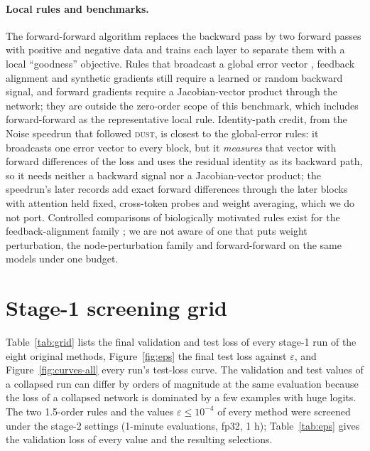 \documentclass{article}
\newcommand{\method}[1]{\textsc{#1}}
\newcommand{\DUST}{\method{dust}}
\begin{document}
\paragraph{Local rules and benchmarks.}
The forward-forward algorithm \citep{hinton2022} replaces the backward pass by two
forward passes with positive and negative data and trains each layer to separate them
with a local ``goodness'' objective. Rules that broadcast a global error vector
\citep{clark2021credit}, feedback alignment \citep{lillicrap2016,nokland2016} and
synthetic gradients \citep{jaderberg2017} still require a learned or random backward
signal, and forward gradients \citep{baydin2022,ren2023} require a Jacobian-vector
product through the network; they are outside the zero-order scope of this benchmark,
which includes forward-forward as the representative local rule. Identity-path credit,
from the Noise speedrun \citep{noise2026} that followed \DUST{}, is closest to the
global-error rules: it broadcasts one error vector to every block, but it \emph{measures}
that vector with forward differences of the loss and uses the residual identity as its
backward path, so it needs neither a backward signal nor a Jacobian-vector product; the
speedrun's later records add exact forward differences through the later blocks with
attention held fixed, cross-token probes and weight averaging, which we do not port.
Controlled comparisons
of biologically motivated rules exist for the feedback-alignment family
\citep{bartunov2018assessing,launay2020direct,sanfiz2021benchmarking}; we are not aware
of one that puts weight perturbation, the node-perturbation family and forward-forward
on the same models under one budget.


\section{Stage-1 screening grid}
\label{app:grid}

Table~\ref{tab:grid} lists the final validation and test loss of every stage-1 run of
the eight original methods, Figure~\ref{fig:eps} the final test loss against
$\varepsilon$, and Figure~\ref{fig:curves-all} every run's test-loss curve. The
validation and test values of a collapsed run can differ by orders of magnitude at the
same evaluation because the loss of a collapsed network is dominated by a few examples
with huge logits. The two 1.5-order rules and the values $\varepsilon\le10^{-4}$ of every method were
screened under the stage-2 settings (1-minute evaluations, fp32, 1 h); Table~\ref{tab:eps}
gives the validation loss of every value and the resulting selections.
\end{document}
